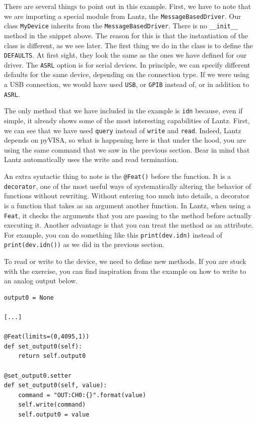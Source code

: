 There are several things to point out in this example. First, we have to note that we are importing a special module from Lantz, the \texttt{MessageBasedDriver}. Our class \texttt{MyDevice} inherits from the \texttt{MessageBasedDriver}. There is no \texttt{__init__} method in the snippet above. The reason for this is that the instantiation of the class is different, as we see later. The first thing we do in the class is to define the \texttt{DEFAULTS}. At first sight, they look the same as the ones we have defined for our driver. The \texttt{ASRL} option is for serial devices. In principle, we can specify different defaults for the same device, depending on the connection type. If we were using a {USB} connection, we would have used \texttt{USB}, or \texttt{GPIB} instead of, or in addition to \texttt{ASRL}.

The only method that we have included in the example is \texttt{idn} because, even if simple, it already shows some of the most interesting capabilities of Lantz. First, we can see that we have used \texttt{query} instead of \texttt{write} and \texttt{read}. Indeed, Lantz depends on pyVISA, so what is happening here is that under the hood, you are using the same command that we saw in the previous section. Bear in mind that Lantz automatically uses the write and read termination.

An extra syntactic thing to note is the \texttt{@Feat()} before the function. It is a \texttt{decorator}, one of the most useful ways of systematically altering the behavior of functions without rewriting. Without entering too much into details, a decorator is a function that takes as an argument another function. In Lantz, when using a \texttt{Feat}, it checks the arguments that you are passing to the method before actually executing it. Another advantage is that you can treat the method as an attribute. For example, you can do something like this \texttt{print(dev.idn)} instead of \texttt{print(dev.idn())} as we did in the previous section.


To read or write to the device, we need to define new methods. If you are stuck with the exercise, you can find inspiration from the example on how to write to an analog output below.

\begin{verbatim}
output0 = None

[...]

@Feat(limits=(0,4095,1))
def set_output0(self):
    return self.output0

@set_output0.setter
def set_output0(self, value):
    command = "OUT:CH0:{}".format(value)
    self.write(command)
    self.output0 = value
\end{verbatim}

